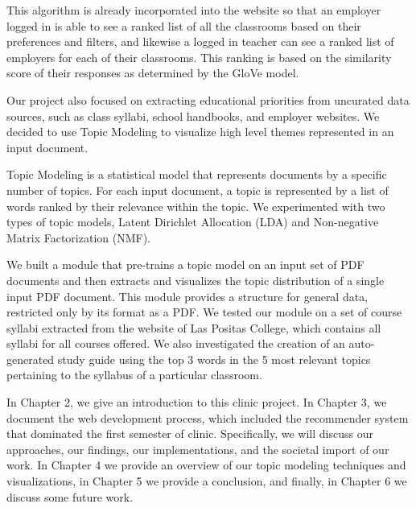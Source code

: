 This algorithm is already incorporated into the website so that an employer logged in is able to see a ranked list of all the classrooms based on their preferences and filters, and likewise a logged in teacher can see a ranked list of employers for each of their classrooms. This ranking is based on the similarity score of their responses as determined by the GloVe model. 

Our project also focused on extracting educational priorities from uncurated data sources, such as class syllabi, school handbooks, and employer websites. We decided to use Topic Modeling to visualize high level themes represented in an input document. 

Topic Modeling is a statistical model that represents documents by a specific number of topics. For each input document, a topic is represented by a list of words ranked by their relevance within the topic.
We experimented with two types of topic models, Latent Dirichlet Allocation (LDA) and Non-negative Matrix Factorization (NMF). 

We built a module that pre-trains a topic model on an input set of PDF documents and then extracts and visualizes the topic distribution of a single input PDF document. This module provides a structure for general data, restricted only by its format as a PDF. We tested our module on a set of course syllabi extracted from the website of Las Positas College, which contains all syllabi for all courses offered. We also investigated the creation of an auto-generated study guide using the top 3 words in the 5 most relevant topics pertaining to the syllabus of a particular classroom.  

In Chapter 2, we give an introduction to this clinic project. In Chapter 3, we document the web development process, which included the recommender system that dominated the first semester of clinic. Specifically, we will discuss our approaches, our findings, our implementations, and the societal import of our work. In Chapter 4 we provide an overview of our topic modeling techniques and visualizations, in Chapter 5 we provide a conclusion, and finally, in Chapter 6 we discuss some future work.

